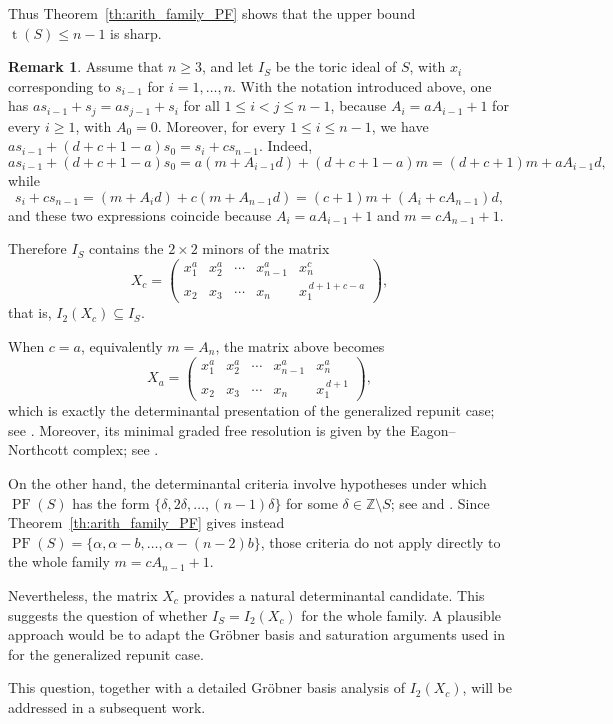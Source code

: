 \documentclass[12pt,a4paper]{amsart}
\theoremstyle{definition}
\newtheorem{remark}[theorem]{Remark}
\begin{document}
Thus Theorem~\ref{th:arith_family_PF} shows that the upper bound $\operatorname{t}(S)\le n-1$ is sharp.

\begin{remark}
Assume that $n\ge 3$, and let $I_S$ be the toric ideal of $S$, with
$x_i$ corresponding to $s_{i-1}$ for $i=1,\ldots,n$. With the notation
introduced above, one has
$a s_{i-1}+s_j=a s_{j-1}+s_i$ for all $1\le i<j\le n-1$, because
$A_i=aA_{i-1}+1$ for every $i\ge 1$, with $A_0=0$. Moreover, for every
$1\le i\le n-1$, we have
$a s_{i-1}+(d+c+1-a)s_0=s_i+c s_{n-1}$.
Indeed,
\[
a s_{i-1}+(d+c+1-a)s_0
=
a(m+A_{i-1}d)+(d+c+1-a)m
=
(d+c+1)m+aA_{i-1}d,
\]
while
\[
s_i+c s_{n-1}
=
(m+A_i d)+c(m+A_{n-1}d)
=
(c+1)m+(A_i+cA_{n-1})d,
\]
and these two expressions coincide because $A_i=aA_{i-1}+1$ and
$m=cA_{n-1}+1$.

Therefore $I_S$ contains the $2\times2$ minors of the matrix
\[
X_c=
\begin{pmatrix}
x_1^a & x_2^a & \cdots & x_{n-1}^a & x_n^c\\
x_2   & x_3   & \cdots & x_n       & x_1^{\,d+1+c-a}
\end{pmatrix},
\]
that is, $I_2(X_c)\subseteq I_S$.

When $c=a$, equivalently $m=A_n$, the matrix above becomes
\[
X_a=
\begin{pmatrix}
x_1^a & x_2^a & \cdots & x_{n-1}^a & x_n^a\\
x_2   & x_3   & \cdots & x_n       & x_1^{\,d+1}
\end{pmatrix},
\]
which is exactly the determinantal presentation of the generalized
repunit case; see \cite[Theorem~1 and Corollary~2]{BrancoColacoOjeda21}.
Moreover, its minimal graded free resolution is given by the
Eagon--Northcott complex; see \cite{ColacoOjeda25}.

On the other hand, the determinantal criteria
\cite{GotoKienMatsuokaTruong18,KienMatsuoka20} involve hypotheses under
which $\operatorname{PF}(S)$ has the form
$\{\delta,2\delta,\ldots,(n-1)\delta\}$ for some
$\delta\in\mathbb Z\setminus S$; see
\cite[Theorem~1.2]{GotoKienMatsuokaTruong18} and
\cite[Theorem~2]{KienMatsuoka20}. Since
Theorem~\ref{th:arith_family_PF} gives instead
$\operatorname{PF}(S)=\{\alpha,\alpha-b,\ldots,\alpha-(n-2)b\}$, those
criteria do not apply directly to the whole family $m=cA_{n-1}+1$.

Nevertheless, the matrix $X_c$ provides a natural determinantal
candidate. This suggests the question of whether $I_S=I_2(X_c)$ for the
whole family. A plausible approach would be to adapt the Gr\"obner basis
and saturation arguments used in \cite{BrancoColacoOjeda21} for the
generalized repunit case.

This question, together with a detailed Gr\"obner basis analysis of $I_2(X_c)$, will be addressed in a subsequent work.
\end{remark}
\end{document}
